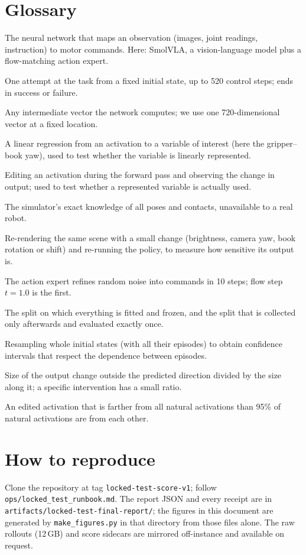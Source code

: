 \documentclass[11pt,a4paper]{article}
\begin{document}
\section{Glossary}
\label{app:gloss}
\begin{description}[style=nextline,leftmargin=1.5em]
\item[Policy] The neural network that maps an observation (images, joint readings, instruction) to motor commands. Here: SmolVLA, a vision-language model plus a flow-matching action expert.
\item[Episode] One attempt at the task from a fixed initial state, up to 520 control steps; ends in success or failure.
\item[Activation] Any intermediate vector the network computes; we use one 720-dimensional vector at a fixed location.
\item[Probe] A linear regression from an activation to a variable of interest (here the gripper--book yaw), used to test whether the variable is linearly represented.
\item[Patching] Editing an activation during the forward pass and observing the change in output; used to test whether a represented variable is actually used.
\item[Privileged state] The simulator's exact knowledge of all poses and contacts, unavailable to a real robot.
\item[Counterfactual transformation] Re-rendering the same scene with a small change (brightness, camera yaw, book rotation or shift) and re-running the policy, to measure how sensitive its output is.
\item[Flow matching / flow step] The action expert refines random noise into commands in 10 steps; flow step $t{=}1.0$ is the first.
\item[Calibration / Locked Test] The split on which everything is fitted and frozen, and the split that is collected only afterwards and evaluated exactly once.
\item[Cluster bootstrap] Resampling whole initial states (with all their episodes) to obtain confidence intervals that respect the dependence between episodes.
\item[Off-target ratio] Size of the output change outside the predicted direction divided by the size along it; a specific intervention has a small ratio.
\item[Off-manifold] An edited activation that is farther from all natural activations than 95\% of natural activations are from each other.
\end{description}

\section{How to reproduce}
\label{app:repro}
Clone the repository at tag \texttt{locked-test-score-v1}; follow \texttt{ops/locked\_test\_runbook.md}. The report JSON and every receipt are in \texttt{artifacts/locked-test-final-report/}; the figures in this document are generated by \texttt{make\_figures.py} in that directory from those files alone. The raw rollouts (12\,GB) and score sidecars are mirrored off-instance and available on request.
\end{document}

